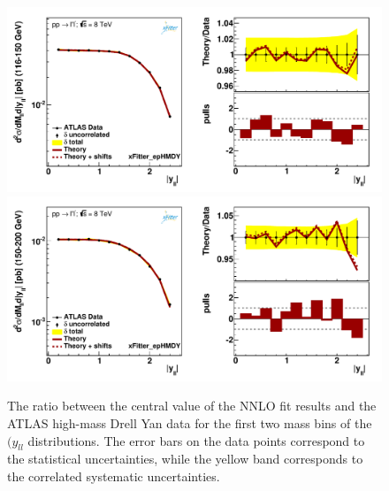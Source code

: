 \begin{figure}[t]
\centering
\includegraphics[width=16cm]{figs/data_401-1.pdf}\\
\includegraphics[width=16cm]{figs/data_402-1.pdf}
\caption{The ratio between the central value of the NNLO fit results
  and the ATLAS high-mass Drell Yan data
  for the first two mass bins of the $(y_{ll}$ distributions.
  The error bars on the data points correspond to the statistical
  uncertainties, while the yellow band
  corresponds to the correlated systematic uncertainties.
}
\label{hmDY_2D_1}
\end{figure}

